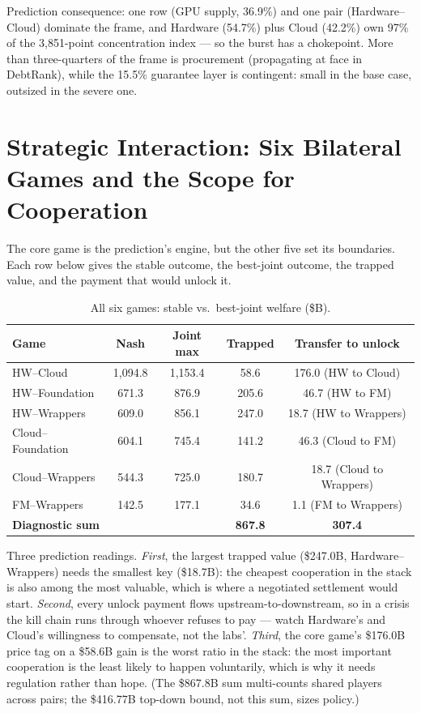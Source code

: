 \documentclass[11pt,a4paper]{article}
\begin{document}
Prediction consequence: one row (GPU supply, 36.9\%) and one pair
(Hardware--Cloud) dominate the frame, and Hardware (54.7\%) plus Cloud
(42.2\%) own 97\% of the 3,851-point concentration index --- so the burst
has a chokepoint. More than three-quarters of the frame is procurement
(propagating at face in DebtRank), while the 15.5\% guarantee layer is
contingent: small in the base case, outsized in the severe one.

\section{Strategic Interaction: Six Bilateral Games and the Scope for Cooperation}\label{sec:games}
The core game is the prediction's engine, but the other five set its
boundaries. Each row below gives the stable outcome, the best-joint
outcome, the trapped value, and the payment that would unlock it.

\begin{table}[htbp]
\centering
\caption{All six games: stable vs.\ best-joint welfare (\$B).}
    \label{tab:02-all-six-games-stable}
\begin{tabular}{lcccc}
\toprule
Game & Nash & Joint max & Trapped & Transfer to unlock \\
\midrule
HW--Cloud & 1,094.8 & 1,153.4 & 58.6 & 176.0 (HW to Cloud) \\
HW--Foundation & 671.3 & 876.9 & 205.6 & 46.7 (HW to FM) \\
HW--Wrappers & 609.0 & 856.1 & 247.0 & 18.7 (HW to Wrappers) \\
Cloud--Foundation & 604.1 & 745.4 & 141.2 & 46.3 (Cloud to FM) \\
Cloud--Wrappers & 544.3 & 725.0 & 180.7 & 18.7 (Cloud to Wrappers) \\
FM--Wrappers & 142.5 & 177.1 & 34.6 & 1.1 (FM to Wrappers) \\
\midrule
\textbf{Diagnostic sum} & & & \textbf{867.8} & \textbf{307.4} \\
\bottomrule
\end{tabular}
\end{table}

Three prediction readings. \emph{First}, the largest trapped value
(\$247.0B, Hardware--Wrappers) needs the smallest key (\$18.7B): the
cheapest cooperation in the stack is also among the most valuable, which is
where a negotiated settlement would start. \emph{Second}, every unlock
payment flows upstream-to-downstream, so in a crisis the kill chain runs
through whoever refuses to pay --- watch Hardware's and Cloud's willingness
to compensate, not the labs'. \emph{Third}, the core game's \$176.0B price
tag on a \$58.6B gain is the worst ratio in the stack: the most important
cooperation is the least likely to happen voluntarily, which is why it needs
regulation rather than hope. (The \$867.8B sum multi-counts shared players
across pairs; the \$416.77B top-down bound, not this sum, sizes policy.)
\end{document}
